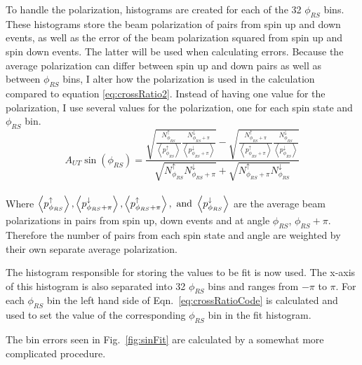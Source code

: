\documentclass[letterpaper, abstract = on,listof=totoc, bibliography=totoc]{scrreprt}
\newcommand{\phirs}{\phi_{RS}}
\begin{document}
To handle the polarization, histograms are created for each of the 32 $\phirs$ bins. These histograms store the beam polarization of pairs from spin up and down events, as well as the error of the beam polarization squared from spin up and spin down events. The latter will be used when calculating errors. %
%
%
Because the average polarization can differ between spin up and down pairs as well as between $\phirs$ bins, I alter how the polarization is used in the calculation compared to equation \ref{eq:crossRatio2}. Instead of having one value for the polarization, I use several values for the polarization, one for each spin state and $\phirs$ bin.    
\begin{equation}
\label{eq:crossRatioCode}
A_{UT}\sin(\phi_{RS} ) = \frac{\sqrt{\frac{N^\uparrow_{\phi_{RS}}}{\left<p^\uparrow_{\phirs}\right>} \frac{N^\downarrow_{\phi_{RS}+\pi}}{\left<p^\downarrow_{\phirs+\pi}\right>}} - \sqrt{\frac{N^\uparrow_{\phi_{RS}+\pi}}{\left<p^\uparrow_{\phirs+\pi}\right>} \frac{N^\downarrow_{\phi_{RS}}}{\left<p^\downarrow_{\phirs}\right>}}}       {\sqrt{N^\uparrow_{\phi_{RS}} N^\downarrow_{\phi_{RS}+\pi}} + \sqrt{N^\uparrow_{\phi_{RS}+\pi} N^\downarrow_{\phi_{RS}}}}
\end{equation}\\
%
Where $\left<p^\uparrow_{\phirs}\right>, \left<p^\downarrow_{\phirs+\pi}\right>, \left<p^\uparrow_{\phirs+\pi}\right>, \textnormal{ and } \left<p^\downarrow_{\phirs}\right>$ are the average beam polarizations in pairs from spin up, down events and at angle $\phirs$, $\phirs + \pi$. Therefore the number of pairs from each spin state and angle are weighted by their own separate average polarization.   

The histogram responsible for storing the values to be fit is now used. The x-axis of this histogram is also separated into 32 $\phirs$ bins and ranges from $-\pi$ to $\pi$. For each $\phirs$ bin the left hand side of Eqn.~\ref{eq:crossRatioCode} is calculated and used to set the value of the corresponding $\phirs$ bin in the fit histogram.

The bin errors seen in Fig.~\ref{fig:sinFit} are calculated by a somewhat more complicated procedure. 
\end{document}
